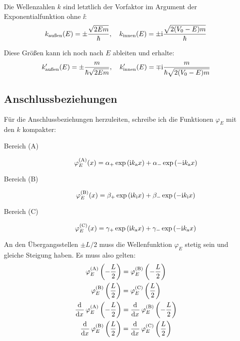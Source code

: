 Die Wellenzahlen $k$ sind letztlich der Vorfaktor im Argument der
Exponentialfunktion ohne $\ii$:
\[
	k_\text{außen}(E) = \pm \frac{\sqrt{2Em}}\hbar
	,\quad
	k_\text{innen}(E) = \pm \mathrm i \frac{\sqrt{2(V_0-E)m}}\hbar
\]

Diese Größen kann ich noch nach $E$ ableiten und erhalte:
\[
	k'_\text{außen}(E) = \pm \frac{m}{\hbar\sqrt{2Em}}
	,\quad
	k'_\text{innen}(E) = \mp \mathrm i \frac{m}{\hbar\sqrt{2(V_0-E)m}}
\]

\subsection{Anschlussbeziehungen}

Für die Anschlussbeziehungen herzuleiten, schreibe ich die Funktionen
$\varphi_E$ mit den $k$ kompakter:

\begin{description}
	\item[Bereich (A)]
		\[
			\phiA(x) = \alpha_+ \exp\del{\ii k_\text{a} x}
			+ \alpha_- \exp\del{-\ii k_\text{a} x}
		\]

	\item[Bereich (B)]
		\[
			\phiB(x) = \beta_+ \exp\del{\ii k_\text{i} x}
			+ \beta_- \exp\del{-\ii k_\text{i} x}
		\]

	\item[Bereich (C)]
		\[
			\phiC(x) = \gamma_+ \exp\del{\ii k_\text{a} x}
			+ \gamma_- \exp\del{-\ii k_\text{a} x}
		\]
\end{description}

An den Übergangsstellen $\pm L/2$ muss die Wellenfunktion $\varphi_E$ stetig
sein und gleiche Steigung haben. Es muss also gelten:
\begin{gather*}
	\phiA\del{-\frac L2} = \phiB\del{-\frac L2} \\
	\phiB\del{\frac L2} = \phiC\del{\frac L2} \\
	\dod{}x \phiA\del{-\frac L2} = \dod{}x \phiB\del{-\frac L2} \\
	\dod{}x \phiB\del{\frac L2} = \dod{}x \phiC\del{\frac L2} \\
\end{gather*}


\IfFileExists{\bibliographyfile}{
}{}



